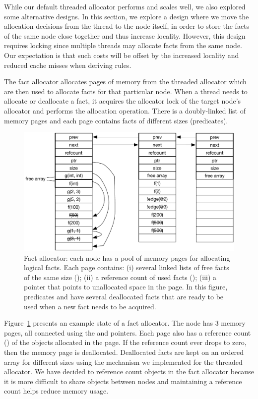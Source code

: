 While our default threaded allocator performs and scales well, we also explored
some alternative designs. In this section, we explore a design where we move the
allocation decisions from the thread to the node itself, in order to store the
facts of the same node close together and thus increase locality. However, this
design requires locking since multiple threads may allocate facts from the same
node. Our expectation is that such costs will be offset by the increased
locality and reduced cache misses when deriving rules.

The fact allocator allocates pages of memory from the threaded allocator which
are then used to allocate facts for that particular node. When a thread needs to
allocate or deallocate a fact, it acquires the allocator lock of the target
node's allocator and performs the allocation operation. There is a doubly-linked
list of memory pages and each page contains facts of different sizes
(predicates).

\begin{figure}[ht]
   \begin{center}
      \includegraphics[width=0.7\linewidth]{figures/implementation/fact_allocator.pdf}
   \end{center}

   \caption{Fact allocator: each node has a pool of memory pages for allocating
      logical facts. Each page contains: (i) several linked lists of free facts
      of the same size (); (ii) a reference count of used
      facts (); (iii) a  pointer that points to
      unallocated space in the page. In this figure, predicates  and
       have several deallocated facts that are ready to be used when a
   new fact needs to be acquired.}

   \label{fig:implementation:fact_allocator}
\end{figure}

Figure~\ref{fig:implementation:fact_allocator} presents an example state of a
fact allocator. The node has 3 memory pages, all connected using the 
and  pointers. Each page also has a reference count ()
of the objects allocated in the page. If the reference count ever drops to zero,
then the memory page is deallocated. Deallocated facts are kept on an ordered
array for different sizes using the mechanism we implemented for the threaded
allocator. We have decided to reference count objects in the fact allocator
because it is more difficult to share objects between nodes and maintaining a
reference count helps reduce memory usage.

